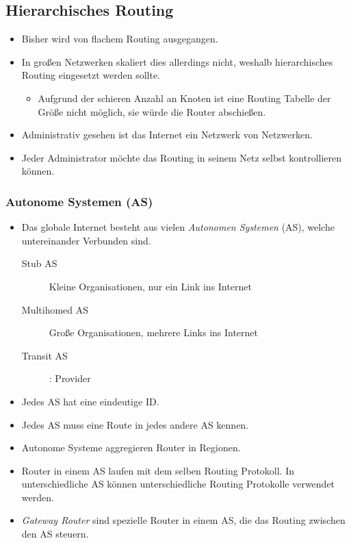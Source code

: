 		\subsection{Hierarchisches Routing}
			\begin{itemize}
				\item Bisher wird von flachem Routing ausgegangen.
				\item In großen Netzwerken skaliert dies allerdings nicht, weshalb hierarchisches Routing eingesetzt werden sollte.
					\begin{itemize}
						\item Aufgrund der schieren Anzahl an Knoten ist eine Routing Tabelle der Größe nicht möglich, sie würde die Router abschießen.
					\end{itemize}
				\item Administrativ gesehen ist das Internet ein Netzwerk von Netzwerken.
				\item Jeder Administrator möchte das Routing in seinem Netz selbst kontrollieren können.
			\end{itemize}

			\subsubsection{Autonome Systemen (AS)}
				\begin{itemize}
					\item Das globale Internet besteht aus vielen \textit{Autonomen Systemen} (AS), welche untereinander Verbunden sind.
						\begin{description}
							\item[Stub AS] Kleine Organisationen, nur ein Link ins Internet
							\item[Multihomed AS] Große Organisationen, mehrere Links ins Internet
							\item[Transit AS]: Provider
						\end{description}
					\item Jedes AS hat eine eindeutige ID.
					\item Jedes AS muss eine Route in jedes andere AS kennen.
					\item Autonome Systeme aggregieren Router in Regionen.
					\item Router in einem AS laufen mit dem selben Routing Protokoll. In unterschiedliche AS können unterschiedliche Routing Protokolle verwendet werden.
					\item \textit{Gateway Router} sind spezielle Router in einem AS, die das Routing zwischen den AS steuern.
				\end{itemize}

